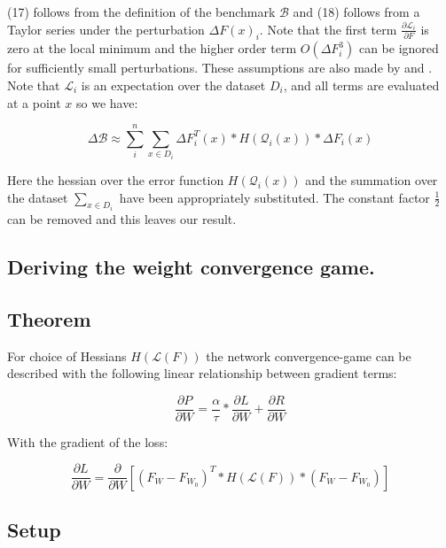 \documentclass{article}
\begin{document}
(17) follows from the definition of the benchmark $\mathcal{B}$ and (18) follows from a Taylor series under the perturbation $\Delta F (x)_i$. Note that the first term $\frac{\partial \mathcal{L}_i}{\partial F}$ is zero at the local minimum and the higher order term $O(\Delta F_i^3)$ can be ignored for sufficiently small perturbations. These assumptions are also made by \cite{lecun1989optimalbraindamage} and \cite{yu2017nisp}. Note that $\mathcal{L}_i$ is an expectation over the dataset $D_i$, and all terms are evaluated at a point $x$ so we have:
\smallskip

\begin{equation}
\Delta \mathcal{B} \approx \sum_{i}^{n} \sum_{x \in D_i}  \Delta F_i^T(x) * H(\mathcal{Q}_i(x)) * \Delta F_i(x) 
\end{equation}

Here the hessian over the error function $H(\mathcal{Q}_i(x))$ and the summation over the dataset $\sum_{x \in D_i}$ have been appropriately substituted. The constant factor $\frac{1}{2}$ can be removed and this leaves our result.
\smallskip

\subsection{Deriving the weight convergence game.}

\subsection{Theorem}

For choice of Hessians $H(\mathcal{L}(F))$ the network convergence-game can be described with the following linear relationship between gradient terms:

\begin{equation}
\frac{\partial P}{\partial W} = \frac{\alpha}{\tau} * \frac{\partial L}{\partial W} + \frac{\partial R}{\partial W}
\end{equation}
\smallskip

With the gradient of the loss:

\begin{equation}
\frac{\partial L}{\partial W} = \frac{\partial}{\partial W} [(F_W - F_{W_0})^T * H( \mathcal{L}(F)) * (F_W - F_{W_0})] 
\end{equation}
\smallskip


\subsection{Setup}
\end{document}

